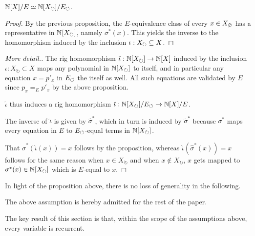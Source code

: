 \documentclass[numbers=enddot]{scrartcl}
\newcommand{\Xcyc}{X_{\circlearrowright}}
\newcommand{\Xacyc}{X_{\not\circlearrowright}}
\begin{document}
\begin{prop}
  $\nat[X]/E \simeq \nat[\Xcyc]/\Ecyc$.
\end{prop}
\begin{proof}
  By the previous proposition, the $E$-equivalence class of every $x \in \Xacyc$ has a
  representative in $\nat[\Xcyc]$, namely $\sigma^*(x)$.  This yields the inverse
  to the homomorphism induced by the inclusion $\iota : \Xcyc \sse X$.
\end{proof}
\begin{proof}[More detail.]
  The rig homomorphism $\tilde\iota : \nat[\Xcyc] \to \nat[X]$
  induced by the inclusion $\iota : \Xcyc \subset X$ maps
  any polynomial in $\nat[\Xcyc]$ to itself,
  and in particular any equation $x = p'_x$ in $E_\circlearrowleft$
  the itself as well.  All such equations are validated by $E$
  since $p_x =_E p'_x$ by the above proposition.

  $\tilde\iota$ thus induces a rig homomorphism $\hat \iota :
  \nat[\Xcyc]/\Ecyc \to \nat[X]/E$.

  The inverse of $\hat \iota$ is given by $\hat \sigma^*$, which in turn
  is induced by $\tilde \sigma^*$ because $\sigma^*$ maps every equation
  in $E$ to $E_\circlearrowleft$-equal terms in $\nat[\Xcyc]$.

  That $\hat \sigma^*(\hat \iota (x)) = x$ follows by the proposition,
  whereas $\hat \iota (\hat \sigma^*(x)) = x$ follows for the same
  reason when $x \in \Xcyc$ and when $x \notin \Xcyc$,
  $x$ gets mapped to $\sigma^*(x) \in \nat[\Xcyc]$ which is $E$-equal to $x$.
\end{proof}

In light of the proposition above, there is no loss of generality
in the following.

\begin{asmn}
  \label{asmn:cyc}
   \fbox{$X = \Xcyc$}
 \end{asmn}

The above assumption is hereby admitted for the rest of the paper.

The key result of this section is that, within the scope of the assumptions above,
every variable is recurrent.
\end{document}
